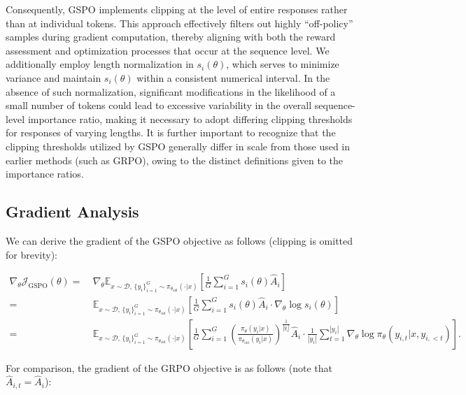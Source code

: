 Consequently, GSPO implements clipping at the level of entire responses rather than at individual tokens. This approach effectively filters out highly ``off-policy'' samples during gradient computation, thereby aligning with both the reward assessment and optimization processes that occur at the sequence level. We additionally employ length normalization in $s_{i}(\theta)$, which serves to minimize variance and maintain $s_{i}(\theta)$ within a consistent numerical interval. In the absence of such normalization, significant modifications in the likelihood of a small number of tokens could lead to excessive variability in the overall sequence-level importance ratio, making it necessary to adopt differing clipping thresholds for responses of varying lengths. It is further important to recognize that the clipping thresholds utilized by GSPO generally differ in scale from those used in earlier methods (such as GRPO), owing to the distinct definitions given to the importance ratios.

\subsection{Gradient Analysis}
\label{subsec:gradient}

We can derive the gradient of the GSPO objective as follows (clipping is omitted for brevity):

\begin{align}
\nabla_{\theta} \mathcal{J}_\text{GSPO} (\theta)
=&\ 
\nabla_{\theta} \mathbb{E}_{ x \sim \mathcal{D},\, \{y_i\}_{i=1}^G \sim \pi_{\theta_\text{old}}( \cdot | x) }
\left[ 
\frac{1}{G} \sum_{i=1}^{G} s_{i}(\theta) \widehat{A}_{i}
\right] \\
= &\ 
\mathbb{E}_{ x \sim \mathcal{D},\, \{y_i\}_{i=1}^G \sim \pi_{\theta_\text{old}}( \cdot | x) }
\left[ 
\frac{1}{G} \sum_{i=1}^{G}
s_{i}(\theta) \widehat{A}_{i}
\cdot \nabla_{\theta} \log s_{i}(\theta)
\right] \\
=&\ 
\mathbb{E}_{ x \sim \mathcal{D},\, \{y_i\}_{i=1}^G \sim \pi_{\theta_\text{old}}( \cdot | x) }
\left[ 
\frac{1}{G} \sum_{i=1}^{G} 
\left( \frac{ \pi_{\theta} (y_i | x) }{ \pi_{\theta_\text{old}} (y_i | x)} \right)^{\frac{1}{|y_i|}} \widehat{A}_{i} 
\cdot \frac{1}{|y_i|} \sum_{t=1}^{|y_i|} \nabla_{\theta} \log \pi_{\theta} (y_{i,t} | x, y_{i,<t}) 
\right].
\label{equ:gspo_grad}
\end{align}

For comparison, the gradient of the GRPO objective is as follows (note that $\widehat{A}_{i,t} = \widehat{A}_{i}$):

